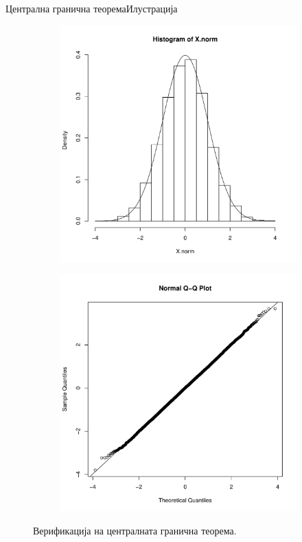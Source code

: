 \documentclass[hyperref={unicode}, xcolor={svgnames, table},
usepdftitle=false]{beamer}
\theoremstyle{remark}
\begin{document}
\begin{frame}{Централна гранична теорема}{Илустрација}
  \begin{figure}
    \centering
    \begin{subfigure}[b]{.45\linewidth}
      \includegraphics[width=\textwidth]{Histogram_CLT.pdf}
    \end{subfigure}
    \begin{subfigure}[b]{.45\linewidth}
      \includegraphics[width=\textwidth]{QQ_CLT.pdf}
    \end{subfigure}
    \caption{Верификација на централната гранична теорема.}
  \end{figure}
\end{frame}
\end{document}
